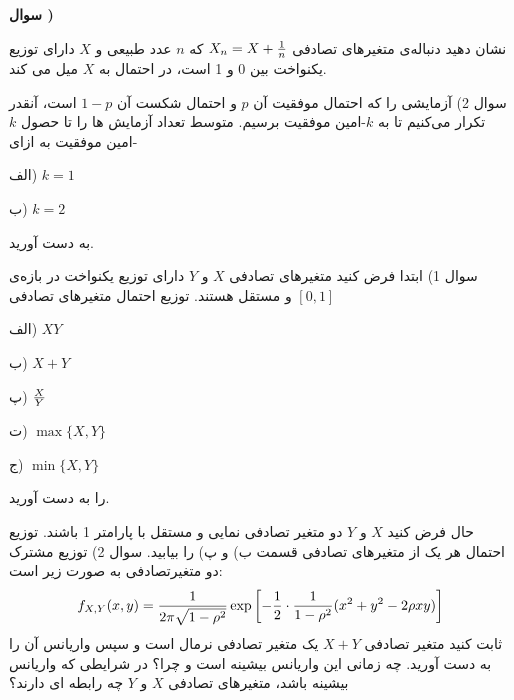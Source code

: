 \documentclass[10pt,letterpaper]{report}
\newcounter{questionnumber}
\newcommand{\Q}{
\textbf{سوال \thequestionnumber)}
\stepcounter{questionnumber}
}
\begin{document}
\Q
نشان دهید دنباله‌ی متغیرهای تصادفی 
$
X_n=X+{1\over n}
$
که $n$ عدد طبیعی و $X$ دارای توزیع یکنواخت بین 0 و 1 است، در احتمال به $X$ میل می کند.


































سوال 2) آزمایشی را که احتمال موفقیت آن $p$ و احتمال شکست آن $1-p$ است، آنقدر تکرار می‌کنیم تا به $k$-امین موفقیت برسیم. متوسط تعداد آزمایش ها را تا حصول $k$-امین موفقیت به ازای 

الف) $k=1$

ب) $k=2$

به دست آورید.










%
%
%
سوال 1) ابتدا فرض کنید متغیرهای تصادفی $X$ و $Y$ دارای توزیع یکنواخت در بازه‌ی $[0,1]$ و مستقل هستند. توزیع احتمال متغیرهای تصادفی 

الف) $XY$

ب) $X+Y$

پ) 
$
X\over Y
$

ت) 
$
\max\{X,Y\}
$

ج)
$
\min\{X,Y\}
$

را به دست آورید.

حال فرض کنید $X$ و $Y$ دو متغیر تصادفی نمایی و مستقل با پارامتر 1 باشند. توزیع احتمال هر یک از متغیرهای تصادفی قسمت ب) و پ) را بیابید.
%
%
\newline\newline
سوال 2) توزیع مشترک دو متغیرتصادفی به صورت زیر است:
$$
f_{X,Y}(x,y)={1\over 2\pi \sqrt{1-\rho^2}}\exp\left[-{1\over 2}\cdot{1\over 1-\rho^2}(x^2+y^2-2\rho xy)\right]
$$
ثابت کنید متغیر تصادفی $X+Y$ یک متغیر تصادفی نرمال است و سپس واریانس آن را به دست آورید. چه زمانی این واریانس بیشینه است و چرا؟ در شرایطی که واریانس بیشینه باشد، متغیرهای تصادفی $X$ و $Y$ چه رابطه ای دارند؟
%
%
\end{document}
